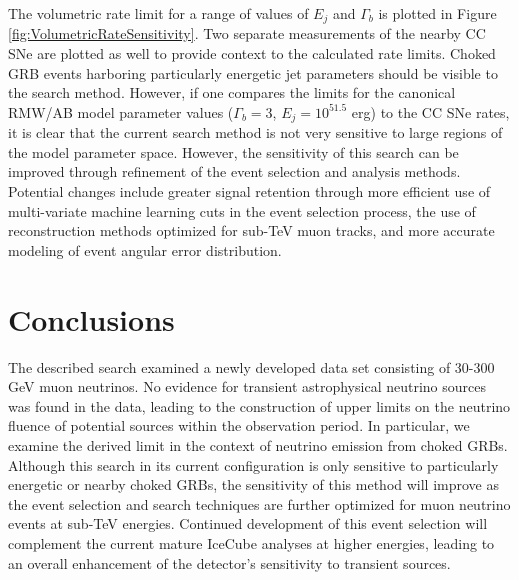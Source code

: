 \documentclass[manuscript]{aastex}
\begin{document}
The volumetric rate limit for a range of values of $E_j$ and $\Gamma_b$ is plotted in Figure \ref{fig:VolumetricRateSensitivity}. Two separate measurements of the nearby CC SNe are plotted as well to provide context to the calculated rate limits. Choked GRB events harboring particularly energetic jet parameters should be visible to the search method. However, if one compares the limits for the canonical RMW/AB model parameter values ($\Gamma_b = 3$, $E_j = 10^{51.5}$ erg) to the CC SNe rates, it is clear that the current search method is not very sensitive to large regions of the model parameter space. However, the sensitivity of this search can be improved through refinement of the event selection and analysis methods. Potential changes include greater signal retention through more efficient use of multi-variate machine learning cuts in the event selection process, the use of reconstruction methods optimized for sub-TeV muon tracks, and more accurate modeling of event angular error distribution. 

\section{Conclusions}
The described search examined a newly developed data set consisting of 30-300 GeV muon neutrinos. No evidence for transient astrophysical neutrino sources was found in the data, leading to the construction of upper limits on the neutrino fluence of potential sources within the observation period. In particular, we examine the derived limit in the context of neutrino emission from choked GRBs. Although this search in its current configuration is only sensitive to particularly energetic or nearby choked GRBs, the sensitivity of this method will improve as the event selection and search techniques are further optimized for muon neutrino events at sub-TeV energies. Continued development of this event selection will complement the current mature IceCube analyses at higher energies, leading to an overall enhancement of the detector's sensitivity to transient sources.
\end{document}
